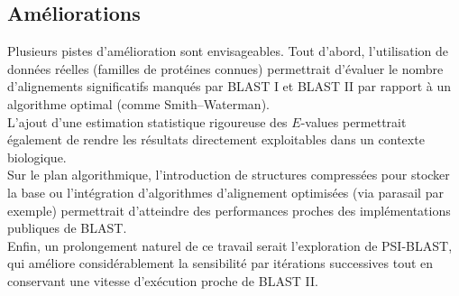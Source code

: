\documentclass[conference]{IEEEtran}
\begin{document}
\subsection{Améliorations}
Plusieurs pistes d’amélioration sont envisageables.
Tout d'abord, l’utilisation de données réelles (familles de protéines connues) permettrait d’évaluer le nombre d’alignements significatifs manqués par BLAST I et BLAST II par rapport à un algorithme optimal (comme Smith–Waterman).\\
L’ajout d’une estimation statistique rigoureuse des $E$-values permettrait également de rendre les résultats directement exploitables dans un contexte biologique.\\
Sur le plan algorithmique, l’introduction de structures compressées pour stocker la base ou l’intégration d'algorithmes d’alignement optimisées (via  parasail par exemple) permettrait d’atteindre des performances proches des implémentations publiques de BLAST.\\
Enfin, un prolongement naturel de ce travail serait l’exploration de PSI-BLAST, qui améliore considérablement la sensibilité par itérations successives tout en conservant une vitesse d’exécution proche de BLAST II.
\end{document}
